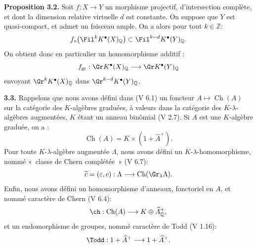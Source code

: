 \textbf{Proposition 3.2.} Soit $f:X\to Y$ un morphisme projectif, d'intersection complète, et dont la dimension relative virtuelle $d$ est constante. On suppose que $Y$ est quasi-compact, et admet un faisceau ample. On a alors pour tout $k\in\mathbb Z$:
\[
f_*\bigl(\Fil^kK^{\bullet}(X)_{\mathbb Q}\bigr)
\subset
\Fil^{k-d}K^{\bullet}(Y)_{\mathbb Q}.
\]
On obtient donc en particulier un homomorphisme additif :
\[
f_{\mathrm{gr}}:\Gr K^{\bullet}(X)_{\mathbb Q}\longrightarrow
\Gr K^{\bullet}(Y)_{\mathbb Q}
\]
envoyant $\Gr^kK^{\bullet}(X)_{\mathbb Q}$ dans $\Gr^{k-d}K^{\bullet}(Y)_{\mathbb Q}$.

\textbf{3.3.} Rappelons que nous avons défini dans (V 6.1) un foncteur $A\longmapsto \operatorname{Ch}(A)$ sur la catégorie des $K$-algèbres graduées, à valeurs dans la catégorie des $K$-$\lambda$-algèbres augmentées, $K$ étant un anneau binômial (V 2.7). Si $A$ est une $K$-algèbre graduée, on a :
\[
\operatorname{Ch}(A)=K\times(1+\widehat A^+).
\]
Pour toute $K$-$\lambda$-algèbre augmentée $\Lambda$, nous avons défini un $K$-$\lambda$-homomorphisme, nommé «~classe de Chern complétée~» (V 6.7):
\[
\widetilde c=(\varepsilon,c):\Lambda\longrightarrow\operatorname{Ch}(\Gr_{\lambda}\Lambda).
\]
Enfin, nous avons défini un homomorphisme d'anneaux, fonctoriel en $A$, et nommé caractère de Chern (V 6.4):
\[
\ch:\operatorname{Ch}(A)\longrightarrow K\oplus\widehat A^+_{\mathbb Q},
\]
et un endomorphisme de groupes, nommé caractère de Todd (V 1.16):
\[
\Todd:1+\widehat A^+\longrightarrow1+\widehat A^+.
\]
